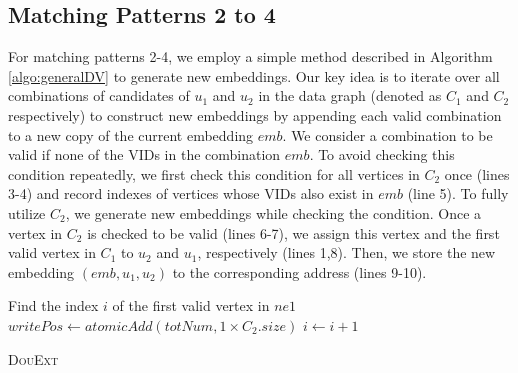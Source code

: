 \subsection{Matching Patterns 2 to 4}

For matching patterns 2-4, we employ a simple method described in Algorithm \ref{algo:generalDV} to generate new
embeddings. Our key idea is to iterate over all combinations of candidates of $u_{1}$ and $u_{2}$ in the data graph
(denoted as $C_1$ and $C_2$ respectively) to construct new embeddings by appending each valid combination to a new copy
of the current embedding $emb$. We consider a combination to be valid if none of the VIDs in the combination   $emb$. To avoid checking this condition repeatedly, we first check this
condition for all vertices in $C_2$ once (lines 3-4) and record indexes of vertices whose VIDs also exist in $emb$
(line 5). To fully utilize $C_2$, we generate new embeddings while checking the condition. Once a vertex in $C_2$ is
checked to be valid (lines 6-7), we assign this vertex and the first valid vertex in $C_1$ to $u_2$ and $u_1$,
respectively (lines 1,8). Then, we store the new embedding $(emb,u_1,u_2)$ to the corresponding address (lines 9-10).

\begin{algorithm}[t!]
	Find the index $i$ of the first valid vertex in $ne1$\;
	$writePos \leftarrow atomicAdd(totNum,1 \times C_{2}.size)$\;
	$i \leftarrow i+1$\;
	\caption{\textsc{DouExt}}
	\label{algo:generalDV}
\end{algorithm}

